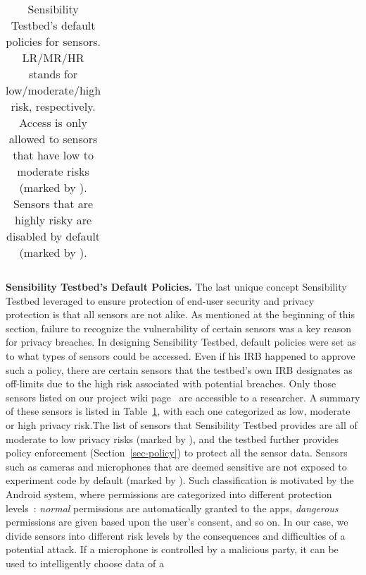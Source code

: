 {\begin{table}
\begin{tabular}{|l|c|c|c|}
\end{tabular}
\egroup

\caption{\small Sensibility Testbed's default policies for sensors. LR/MR/HR
stands for low/moderate/high risk, respectively. Access is only allowed to sensors that have low to 
moderate risks (marked by \tickmark). Sensors that are highly risky are 
disabled by default (marked by \xmark).}
\label{tab:default}
\end{table}

\textbf{Sensibility Testbed's Default Policies.} %
The last unique concept Sensibility Testbed leveraged to  ensure protection of end-user security and privacy protection is that all sensors are not alike. As mentioned at the beginning of this section, failure to recognize the vulnerability of certain sensors was a key reason for privacy breaches. In designing Sensibility Testbed, default policies were set as to what types of sensors could be accessed. Even if his IRB happened to approve such a policy, there are certain sensors that the testbed's
own IRB designates as off-limits due to the high risk associated with potential breaches. 
Only those sensors listed on our project 
wiki page~\cite{sensor-api} are accessible to a researcher. 
A summary of these sensors is listed in Table~\ref{tab:default}, 
with each one categorized as low, moderate or high 
privacy risk.The list of sensors that Sensibility Testbed provides are all of moderate 
to low privacy risks (marked by \tickmark), and the testbed further provides policy enforcement
(Section~\ref{sec-policy}) to protect all the sensor data. Sensors 
such as cameras and microphones that are deemed sensitive are not 
exposed to experiment code by default (marked by \xmark). Such 
classification is motivated by the Android system, where 
permissions are categorized into different protection levels~\cite{level}:
\textit{normal} permissions are automatically granted to the apps, 
\textit{dangerous} permissions are given based upon the 
user's consent, and so on. In our case, 
we divide sensors into different risk levels by the consequences and 
difficulties of a potential attack. If a microphone is controlled by 
a malicious party, it can be used to intelligently choose data of a 
}
